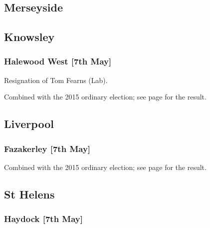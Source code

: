 \documentclass[a4paper,openany]{book}
\begin{document}
\begin{resultsiii}
\section{Merseyside}

\subsection*{Knowsley}

\subsubsection*{Halewood West \hspace*{\fill}\nolinebreak[1]%
\enspace\hspace*{\fill}
[7th May]}


Resignation of Tom Fearns (Lab).

Combined with the 2015 ordinary election; see page \pageref{HalewoodWestKnowsley} for the result.

\subsection*{Liverpool}

\subsubsection*{Fazakerley \hspace*{\fill}\nolinebreak[1]%
\enspace\hspace*{\fill}
[7th May]}



Combined with the 2015 ordinary election; see page \pageref{FazakerleyLiverpool} for the result.

\subsection*{St Helens}

\subsubsection*{Haydock \hspace*{\fill}\nolinebreak[1]%
\enspace\hspace*{\fill}
[7th May]}


\end{resultsiii}
\end{document}
